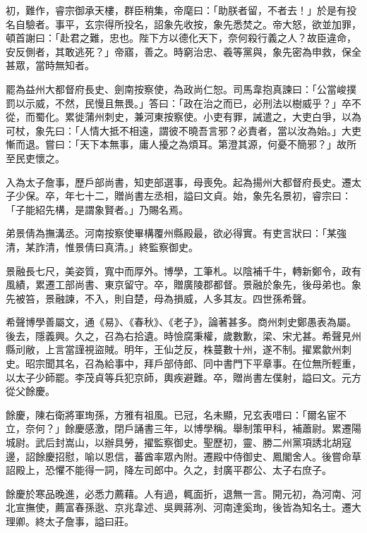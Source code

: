 \begin{pinyinscope}
 初，難作，睿宗御承天樓，群臣稍集，帝麾曰：「助朕者留，不者去！」於是有投名自驗者。事平，玄宗得所投名，詔象先收按，象先悉焚之。帝大怒，欲並加罪，頓首謝曰：「赴君之難，忠也。陛下方以德化天下，奈何殺行義之人？故臣違命，安反側者，其敢逃死？」帝寤，善之。時窮治忠、羲等黨與，象先密為申救，保全甚眾，當時無知者。



 罷為益州大都督府長史、劍南按察使，為政尚仁恕。司馬韋抱真諫曰：「公當峻撲罰以示威，不然，民慢且無畏。」答曰：「政在治之而已，必刑法以樹威乎？」卒不從，而蜀化。累徙蒲州刺史，兼河東按察使。小吏有罪，誡遣之，大吏白爭，以為可杖，象先曰：「人情大抵不相遠，謂彼不曉吾言邪？必責者，當以汝為始。」大吏慚而退。嘗曰：「天下本無事，庸人擾之為煩耳。第澄其源，何憂不簡邪？」故所至民吏懷之。



 入為太子詹事，歷戶部尚書，知吏部選事，母喪免。起為揚州大都督府長史。遷太子少保。卒，年七十二，贈尚書左丞相，謚曰文貞。始，象先名景初，睿宗曰：「子能紹先構，是謂象賢者。」乃賜名焉。



 弟景倩為撫溝丞。河南按察使畢構覆州縣殿最，欲必得實。有吏言狀曰：「某強清，某詐清，惟景倩曰真清。」終監察御史。



 景融長七尺，美姿質，寬中而厚外。博學，工筆札。以陰補千牛，轉新鄭令，政有風績，累遷工部尚書、東京留守。卒，贈廣陵郡都督。景融於象先，後母弟也。象先被笞，景融諫，不入，則自楚，母為損威，人多其友。四世孫希聲。



 希聲博學善屬文，通《易》、《春秋》、《老子》，論著甚多。商州刺史鄭愚表為屬。後去，隱義興。久之，召為右拾遺。時憸腐秉權，歲數歉，梁、宋尤甚。希聲見州縣刓敝，上言當謹視盜賊。明年，王仙芝反，株蔓數十州，遂不制。擢累歙州刺史。昭宗聞其名，召為給事中，拜戶部侍郎、同中書門下平章事。在位無所輕重，以太子少師罷。李茂貞等兵犯京師，輿疾避難。卒，贈尚書左僕射，謚曰文。元方從父餘慶。



 餘慶，陳右衛將軍珣孫，方雅有祖風。已冠，名未顯，兄玄表唶曰：「爾名宦不立，奈何？」餘慶感激，閉戶誦書三年，以博學稱。舉制策甲科，補蕭尉。累遷陽城尉。武后封嵩山，以辦具勞，擢監察御史。聖歷初，靈、勝二州黨項誘北胡寇邊，詔餘慶招慰，喻以恩信，蕃酋率眾內附。遷殿中侍御史、鳳閣舍人。後嘗命草詔殿上，恐懼不能得一詞，降左司郎中。久之，封廣平郡公、太子右庶子。



 餘慶於寒品晚進，必悉力薦藉。人有過，輒面折，退無一言。開元初，為河南、河北宣撫使，薦富春孫逖、京兆韋述、吳興蔣冽、河南達奚珣，後皆為知名士。遷大理卿。終太子詹事，謚曰莊。




\end{pinyinscope}

